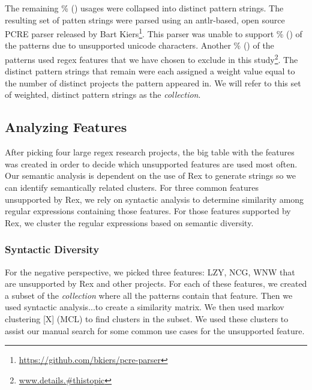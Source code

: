 The remaining \% () usages were collapsed into  distinct pattern strings.  The resulting set of patten strings were parsed using an antlr-based, open source PCRE parser released by Bart Kiers\footnote{\url{https://github.com/bkiers/pcre-parser}}.  This parser was unable to support \% () of the patterns due to unsupported unicode characters.  Another \% () of the patterns used regex features that we have chosen to exclude in this study\footnote{\url{www.details.#thistopic}}.  The  distinct pattern strings that remain were each assigned a weight value equal to the number of distinct projects the pattern appeared in.  We will refer to this set of weighted, distinct pattern strings as the \emph{collection}.

\subsection{Analyzing Features}
\label{study:features}

After picking four large regex research projects, the big table with the features was created in order to decide which unsupported features are used most often.  
Our semantic analysis is dependent on the use of Rex to generate strings so we can identify semantically related clusters. For three common features unsupported by Rex, we rely on syntactic analysis to determine similarity among regular expressions containing those features. For those features supported by Rex, we cluster the regular expressions based on semantic diversity. 

\subsubsection{Syntactic Diversity}
For the negative perspective, we picked three features: LZY, NCG, WNW that are unsupported by Rex and other projects.  For each of these features, we created a subset of the \emph{collection} where all the patterns contain that feature.  Then we used syntactic analysis...to create a similarity matrix.  We then used markov clustering [X] (MCL) to find clusters in the subset.  We used these clusters to assist our manual search for some common use cases for the unsupported feature.

